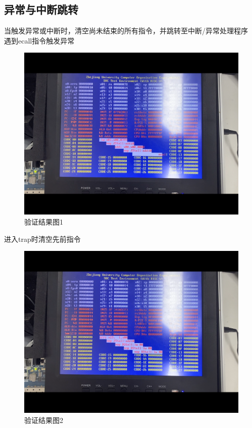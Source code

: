 \subsection{异常与中断跳转}
当触发异常或中断时，清空尚未结束的所有指令，并跳转至中断/异常处理程序\\
遇到ecall指令触发异常
\begin{figure}[H] %
	\centering %
	\includegraphics[width=1.0\textwidth]{figs/7.png} %
	\caption{验证结果图1} %
	\label{Fig.17} %
\end{figure}
进入trap时清空先前指令
\begin{figure}[H] %
	\centering %
	\includegraphics[width=1.0\textwidth]{figs/8.png} %
	\caption{验证结果图2} %
	\label{Fig.18} %
\end{figure}

